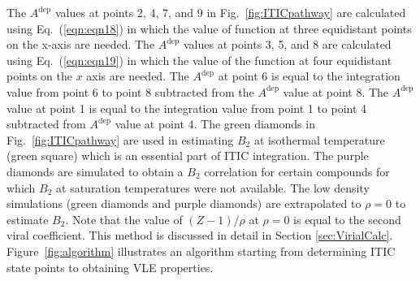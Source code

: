 \documentclass[%
 aip,
 jcp,
 sd,%
 amsmath,amssymb,
 reprint,%
]{revtex4-1}
\begin{document}
The $A^{\mathrm{dep}}$ values at points 2, 4, 7, and 9 in Fig.~\ref{fig:ITICpathway} are calculated using Eq.~(\ref{eqn:eqn18}) in which the value of function at three equidistant points on the x-axis are needed. The $A^{\mathrm{dep}}$ values at points 3, 5, and 8 are calculated using Eq.~(\ref{eqn:eqn19}) in which the value of the function at four equidistant points on the $x$ axis are needed. The $A^{\mathrm{dep}}$ at point 6 is equal to the integration value from point 6 to point 8 subtracted from the $A^{\mathrm{dep}}$ value at point 8. The $A^{\mathrm{dep}}$ value at point 1 is equal to the integration value from point 1 to point 4 subtracted from $A^{\mathrm{dep}}$ value at point 4. The green diamonds in Fig.~\ref{fig:ITICpathway} are used in estimating $B_2$ at isothermal temperature (green square) which is an essential part of ITIC integration. The purple diamonds are simulated to obtain a $B_2$ correlation for certain compounds for which $B_2$ at saturation temperatures were not available. The low density simulations (green diamonds and purple diamonds) are extrapolated to $\rho=0$ to estimate $B_2$. Note that the value of $(Z-1)/\rho$ at $\rho=0$ is equal to the second viral coefficient. This method is discussed in detail in Section \ref{sec:VirialCalc}. Figure~\ref{fig:algorithm} illustrates an algorithm starting from determining  ITIC state points to obtaining VLE properties.
\end{document}
